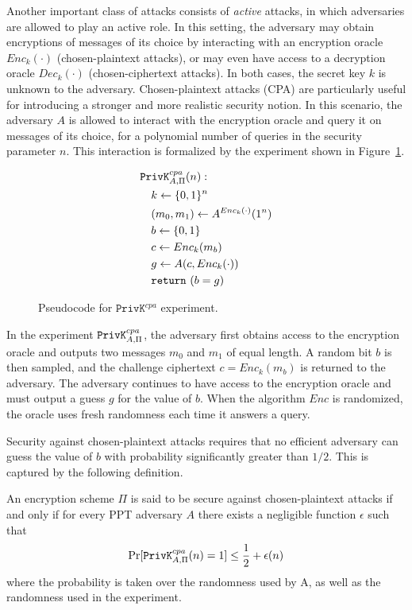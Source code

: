 Another important class of attacks consists of \emph{active} attacks, in which adversaries are allowed to play an active role. In this setting, the adversary may obtain encryptions of messages of its choice by interacting with an encryption oracle $Enc_k(\cdot)$ (chosen-plaintext attacks), or may even have access to a decryption oracle $Dec_k(\cdot)$ (chosen-ciphertext attacks). In both cases, the secret key $k$ is unknown to the adversary. Chosen-plaintext attacks (CPA) are particularly useful for introducing a stronger and more realistic security notion. In this scenario, the adversary $A$ is allowed to interact with the encryption oracle and query it on messages of its choice, for a polynomial number of queries in the security parameter $n$. This interaction is formalized by the experiment shown in Figure~\ref{fig:privk-cpa}.
\begin{figure}[htpb]
    \centering
    \begin{align*}
    &\mathtt{PrivK}^{cpa}_{A,\Pi}(n): \\
    &\quad k \gets \{0,1\}^n \\
    &\quad (m_0, m_1) \gets A^{Enc_k(\cdot)}(1^n) \\
    &\quad b \gets \{0,1\} \\
    &\quad c \gets Enc_k(m_b) \\
    &\quad g \gets A(c, Enc_k(\cdot)) \\
    &\quad \mathtt{return}\,\,(b=g)
    \end{align*}
    \caption{Pseudocode for $\mathtt{PrivK}^{cpa}$ experiment.}
    \label{fig:privk-cpa}
\end{figure}
In the experiment $\mathtt{PrivK}^{cpa}_{A,\Pi}$, the adversary first obtains access to the encryption oracle and outputs two messages $m_0$ and $m_1$ of equal length. A random bit $b$ is then sampled, and the challenge ciphertext $c = Enc_k(m_b)$ is returned to the adversary. The adversary continues to have access to the encryption oracle and must output a guess $g$ for the value of $b$. When the algorithm $Enc$ is randomized, the
oracle uses fresh randomness each time it answers a query. 

Security against chosen-plaintext attacks requires that no efficient adversary can guess the value of $b$ with probability significantly greater than $1/2$. This is captured by the following definition.
\begin{definition}
An encryption scheme $\Pi$ is said to be secure against chosen-plaintext attacks if and only if for every PPT adversary $A$ there exists a negligible function $\epsilon$ such that
\begin{align}
\Pr[\mathtt{PrivK}^{cpa}_{A,\Pi}(n) = 1] \leq \frac{1}{2} + \epsilon(n)
\end{align}
where the probability is taken over the randomness used by A, as well as the randomness used in the experiment.
\end{definition}

